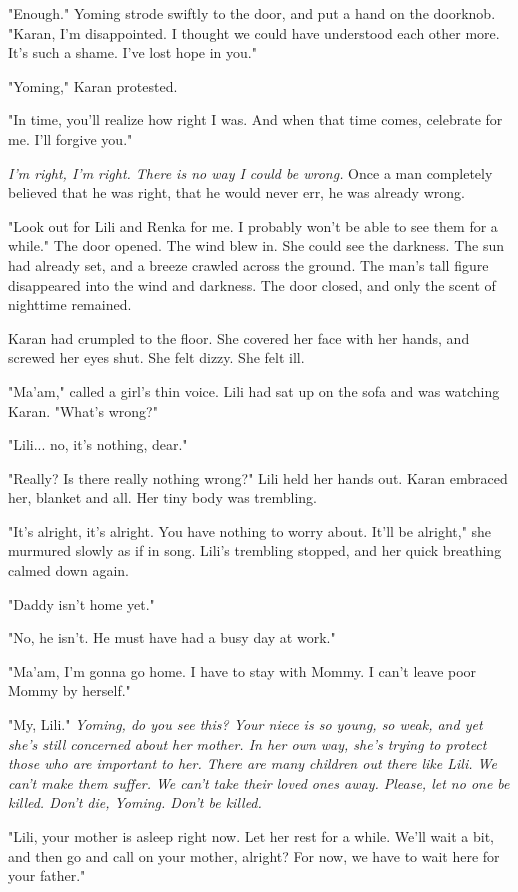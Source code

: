 "Enough." Yoming strode swiftly to the door, and put a hand on the
doorknob. "Karan, I'm disappointed. I thought we could have understood
each other more. It's such a shame. I've lost hope in you."

"Yoming," Karan protested.

"In time, you'll realize how right I was. And when that time comes,
celebrate for me. I'll forgive you."

\emph{I'm right, I'm right. There is no way I could be wrong.} Once a man
completely believed that he was right, that he would never err, he was
already wrong.

"Look out for Lili and Renka for me. I probably won't be able to see
them for a while." The door opened. The wind blew in. She could see the
darkness. The sun had already set, and a breeze crawled across the
ground. The man's tall figure disappeared into the wind and darkness.
The door closed, and only the scent of nighttime remained.

Karan had crumpled to the floor. She covered her face with her hands,
and screwed her eyes shut. She felt dizzy. She felt ill.

"Ma'am," called a girl's thin voice. Lili had sat up on the sofa and was
watching Karan. "What's wrong?"

"Lili... no, it's nothing, dear."

"Really? Is there really nothing wrong?" Lili held her hands out. Karan
embraced her, blanket and all. Her tiny body was trembling.

"It's alright, it's alright. You have nothing to worry about. It'll be
alright," she murmured slowly as if in song. Lili's trembling stopped,
and her quick breathing calmed down again.

"Daddy isn't home yet."

"No, he isn't. He must have had a busy day at work."

"Ma'am, I'm gonna go home. I have to stay with Mommy. I can't leave poor
Mommy by herself."

"My, Lili." \emph{Yoming, do you see this? Your niece is so young, so weak,
and yet she's still concerned about her mother. In her own way, she's
trying to protect those who are important to her. There are many
children out there like Lili. We can't make them suffer. We can't take
their loved ones away. Please, let no one be killed. Don't die, Yoming.
Don't be killed.}

"Lili, your mother is asleep right now. Let her rest for a while. We'll
wait a bit, and then go and call on your mother, alright? For now, we
have to wait here for your father."

